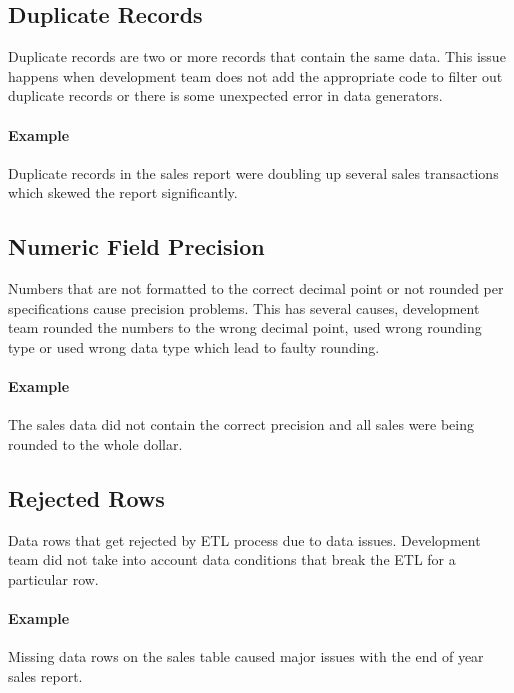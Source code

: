 \subsection*{Duplicate Records}

Duplicate records are two or more records that contain the same data.
This issue happens when development team does not add the appropriate code to filter out duplicate records or there is some unexpected error in data generators.

\paragraph*{Example} Duplicate records in the sales report were doubling up several sales transactions which skewed the report significantly.


\subsection*{Numeric Field Precision}

Numbers that are not formatted to the correct decimal point or not rounded per specifications cause precision problems.
This has several causes, development team rounded the numbers to the wrong decimal point, used wrong rounding type or used wrong data type which lead to faulty rounding.

\paragraph*{Example} The sales data did not contain the correct precision and all sales were being rounded to the whole dollar.

\subsection*{Rejected Rows}

Data rows that get rejected by ETL process due to data issues.
Development team did not take into account data conditions that break the ETL for a particular row.

\paragraph*{Example} Missing data rows on the sales table caused major issues with the end of year sales report.

